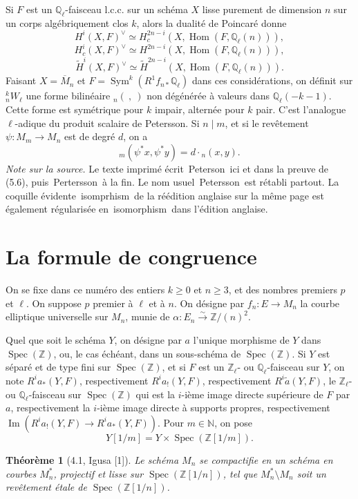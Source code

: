 \documentclass[10pt]{article}
\newcommand{\Q}{\mathbb Q}
\newcommand{\Z}{\mathbb Z}
\newcommand{\Hom}{\operatorname{Hom}}
\newcommand{\Sym}{\operatorname{Sym}}
\newcommand{\Spec}{\operatorname{Spec}}
\newcommand{\Imop}{\operatorname{Im}}
\newcommand{\frquote}[1]{\guillemotleft{}\,#1\,\guillemotright{}}
\newtheorem*{theorem}{Théorème}
\begin{document}
Si $F$ est un $\Q_\ell$-faisceau l.c.c. sur un schéma $X$ lisse purement de dimension
$n$ sur un corps algébriquement clos $k$, alors la dualité de Poincaré donne
\[
H^i(X,F)^\vee\simeq H_c^{2n-i}(X,\Hom(F,\Q_\ell(n))),
\]
\[
H_c^i(X,F)^\vee\simeq H^{2n-i}(X,\Hom(F,\Q_\ell(n))),
\]
\[
\widetilde H^i(X,F)^\vee\simeq \widetilde H^{2n-i}(X,\Hom(F,\Q_\ell(n))).
\]
Faisant $X=\overline M_n$ et $F=\Sym^k(R^1f_{n*}\Q_\ell)$ dans ces considérations, on
définit sur ${}^k_nW_\ell$ une forme bilinéaire ${}_n(\ ,\ )$ non dégénérée à valeurs dans
$\Q_\ell(-k-1)$. Cette forme est symétrique pour $k$ impair, alternée pour $k$ pair.
C'est l'analogue $\ell$-adique du produit scalaire de Petersson. Si $n\mid m$, et si le
revêtement $\psi:M_m\to M_n$ est de degré $d$, on a
\[
{}_m(\psi^*x,\psi^*y)=d\cdot {}_n(x,y).
\]
\noindent\emph{Note sur la source.} Le texte imprimé écrit \frquote{Peterson} ici et dans la preuve de (5.6), puis \frquote{Pertersson} à la fin. Le nom usuel \frquote{Petersson} est rétabli partout. La coquille évidente \frquote{isomprhism} de la réédition anglaise sur la même page est également régularisée en \frquote{isomorphism} dans l'édition anglaise.

\section{La formule de congruence}

On se fixe dans ce numéro des entiers $k\geq 0$ et $n\geq 3$, et des nombres premiers
$p$ et $\ell$. On suppose $p$ premier à $\ell$ et à $n$. On désigne par $f_n:E\to M_n$
la courbe elliptique universelle sur $M_n$, munie de $\alpha:E_n\xrightarrow{\sim}\Z/(n)^2$.

Quel que soit le schéma $Y$, on désigne par $a$ l'unique morphisme de $Y$ dans
$\Spec(\Z)$, ou, le cas échéant, dans un sous-schéma de $\Spec(\Z)$. Si $Y$ est séparé
et de type fini sur $\Spec(\Z)$, et si $F$ est un $\Z_\ell$- ou $\Q_\ell$-faisceau sur $Y$,
on note $R^ia_*(Y,F)$, respectivement $R^ia_!(Y,F)$, respectivement
$R^i\widetilde a(Y,F)$, le $\Z_\ell$- ou $\Q_\ell$-faisceau sur $\Spec(\Z)$ qui est la
$i$-ième image directe supérieure de $F$ par $a$, respectivement la $i$-ième image directe
à supports propres, respectivement $\Imop(R^ia_!(Y,F)\to R^ia_*(Y,F))$.
Pour $m\in\mathbb N$, on pose
\[
Y[1/m]=Y\times\Spec(\Z[1/m]).
\]

\begin{theorem}[4.1, Igusa {\rm [1]}]
Le schéma $M_n$ se compactifie en un schéma en courbes $M_n^*$, projectif et lisse sur $\Spec(\Z[1/n])$, tel que $M_n^*\setminus M_n$ soit un revêtement étale de $\Spec(\Z[1/n])$.
\end{theorem}
\end{document}
